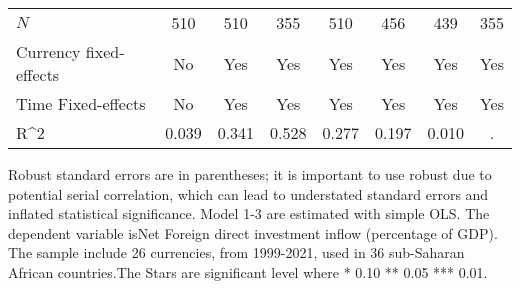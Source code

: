 \begin{table}[H]
\begin{adjustbox}{max width=\textwidth}
\begin{tabular}{l*{7}{c}}
\midrule
\(N\)       &         510         &         510         &         355         &         510         &         456         &         439         &         355         \\
Currency fixed-effects&          No         &         Yes         &         Yes         &         Yes         &         Yes         &         Yes         &         Yes         \\
Time Fixed-effects&          No         &         Yes         &         Yes         &         Yes         &         Yes         &         Yes         &         Yes         \\
R^{2}       &       0.039         &       0.341         &       0.528         &       0.277         &       0.197         &       0.010         &           .         \\
\bottomrule \end{tabular} \end{adjustbox}         \footnotesize \item Robust standard errors are in parentheses; it is important to use robust due to potential serial correlation, which can lead to understated standard errors and inflated statistical significance. Model 1-3 are estimated with simple OLS. The dependent variable isNet Foreign direct investment inflow (percentage of GDP). The sample include 26 currencies, from 1999-2021, used in 36 sub-Saharan African countries.The Stars are significant level where * 0.10 ** 0.05 *** 0.01. \end{table}
